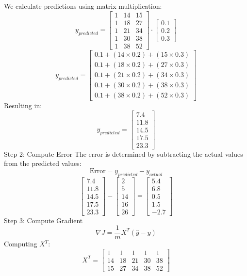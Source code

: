 \documentclass[12pt]{article}
\theoremstyle{definition}
\begin{document}
We calculate predictions using matrix multiplication:
\[
y_{predicted} = \begin{bmatrix}
1 & 14 & 15 \\
1 & 18 & 27 \\
1 & 21 & 34 \\
1 & 30 & 38 \\
1 & 38 & 52
\end{bmatrix}
\cdot
\begin{bmatrix} 0.1 \\ 0.2 \\ 0.3 \end{bmatrix}
\]
\[
y_{predicted} =
\begin{bmatrix}
0.1 + (14 \times 0.2) + (15 \times 0.3) \\
0.1 + (18 \times 0.2) + (27 \times 0.3) \\
0.1 + (21 \times 0.2) + (34 \times 0.3) \\
0.1 + (30 \times 0.2) + (38 \times 0.3) \\
0.1 + (38 \times 0.2) + (52 \times 0.3)
\end{bmatrix}
\]
Resulting in:
\[
y_{predicted} = \begin{bmatrix} 7.4 \\ 11.8 \\ 14.5 \\ 17.5 \\ 23.3 \end{bmatrix}
\]
Step 2: Compute Error
The error is determined by subtracting the actual values from the predicted values:
\[
\text{Error} = y_{predicted} - y_{actual}
\]
\[
\begin{bmatrix} 7.4 \\ 11.8 \\ 14.5 \\ 17.5 \\ 23.3 \end{bmatrix} - \begin{bmatrix} 2 \\ 5 \\ 14 \\ 16 \\ 26 \end{bmatrix}
=
\begin{bmatrix} 5.4 \\ 6.8 \\ 0.5 \\ 1.5 \\ -2.7 \end{bmatrix}
\]
Step 3: Compute Gradient
\[
\nabla J = \frac{1}{m} X^T (\hat{y} - y)
\]
Computing \( X^T \):
\[
X^T =
\begin{bmatrix}
1 & 1 & 1 & 1 & 1 \\
14 & 18 & 21 & 30 & 38 \\
15 & 27 & 34 & 38 & 52
\end{bmatrix}
\]
\end{document}
